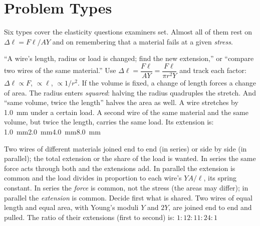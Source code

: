 \section{Problem Types}\label{sec:types-solids}

Six types cover the elasticity questions examiners set. Almost all of them rest on $\Delta\ell=F\ell/AY$
and on remembering that a material fails at a given \emph{stress}.

{``A wire's length, radius or load is changed; find the new extension,'' or ``compare two wires of the
same material.''}
{Use $\Delta\ell=\dfrac{F\ell}{AY}=\dfrac{F\ell}{\pi r^{2}Y}$ and track each factor: $\Delta\ell\propto F$,
$\propto\ell$, $\propto1/r^{2}$. If the volume is fixed, a change of length forces a change of area.}
{The radius enters \emph{squared}: halving the radius quadruples the stretch. And ``same volume, twice the
length'' halves the area as well.}
{A wire stretches by \SI{1.0}{mm} under a certain load. A second wire of the same material and the same
volume, but twice the length, carries the same load. Its extension is:}
{\SI{1.0}{mm}}{\SI{2.0}{mm}}{\SI{4.0}{mm}}{\SI{8.0}{mm}}

{Two wires of different materials joined end to end (in series) or side by side (in parallel); the total
extension or the share of the load is wanted.}
{In series the same force acts through both and the extensions add. In parallel the extension is common
and the load divides in proportion to each wire's $YA/\ell$, its spring constant.}
{In series the \emph{force} is common, not the stress (the areas may differ); in parallel the
\emph{extension} is common. Decide first what is shared.}
{Two wires of equal length and equal area, with Young's moduli $Y$ and $2Y$, are joined end to end and
pulled. The ratio of their extensions (first to second) is:}
{$1:1$}{$2:1$}{$1:2$}{$4:1$}

